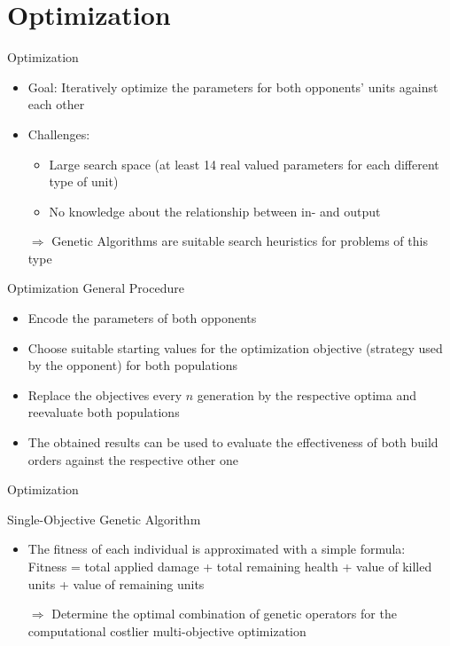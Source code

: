\documentclass{beamer}
\begin{document}
\section{Optimization}
\begin{frame}{Optimization}
\begin{itemize}
\item \alert{Goal:} Iteratively optimize the parameters for both opponents' units against each other
\item \alert{Challenges:} 
\begin{itemize}
\item Large search space (at least 14 real valued parameters for each different type of unit) 
\item No knowledge about the relationship between in- and output
\end{itemize}
\item[$\Rightarrow$] \alert{Genetic Algorithms} are suitable search heuristics for problems of this type
\end{itemize}
\end{frame}

\begin{frame}{Optimization}
\alert{General Procedure}
\begin{itemize}
\item Encode the parameters of both opponents
\item Choose suitable starting values for the optimization objective (strategy used by the opponent) for both populations
\item Replace the objectives every $n$ generation by the respective optima and reevaluate both populations
\item The obtained results can be used to evaluate the effectiveness of both build orders against the respective other one
\end{itemize}
\end{frame}

\begin{frame}{Optimization}

\alert{Single-Objective Genetic Algorithm}
\begin{itemize}
\item The fitness of each individual is approximated with a simple formula:  \\
Fitness =  total applied damage + total remaining health +  value of killed units + value of remaining units 
\item[$\Rightarrow$] Determine the \alert{optimal combination of genetic operators} for the computational costlier multi-objective optimization
\end{itemize}
\end{frame}
\end{document}
